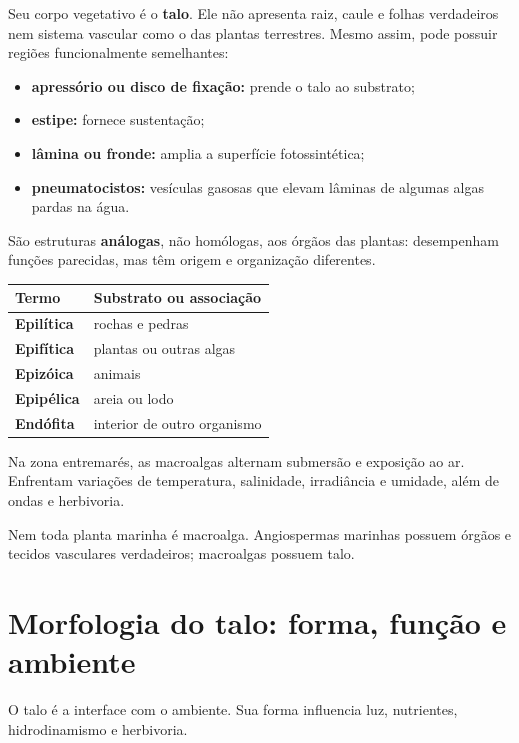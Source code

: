 \documentclass[12pt,a4paper]{article}
\begin{document}
Seu corpo vegetativo é o \textbf{talo}. Ele não apresenta raiz, caule e folhas
verdadeiros nem sistema vascular como o das plantas terrestres. Mesmo assim,
pode possuir regiões funcionalmente semelhantes:
\begin{itemize}
\item \textbf{apressório ou disco de fixação:} prende o talo ao substrato;
\item \textbf{estipe:} fornece sustentação;
\item \textbf{lâmina ou fronde:} amplia a superfície fotossintética;
\item \textbf{pneumatocistos:} vesículas gasosas que elevam lâminas de algumas
algas pardas na água.
\end{itemize}
São estruturas \textbf{análogas}, não homólogas, aos órgãos das plantas:
desempenham funções parecidas, mas têm origem e organização diferentes.

\begin{center}
\begin{tabularx}{0.86\textwidth}{>{\bfseries}lY}
\toprule
Termo & Substrato ou associação\\
\midrule
Epilítica & rochas e pedras\\
Epifítica & plantas ou outras algas\\
Epizóica & animais\\
Epipélica & areia ou lodo\\
Endófita & interior de outro organismo\\
\bottomrule
\end{tabularx}
\end{center}


Na zona entremarés, as macroalgas alternam submersão e exposição ao ar.
Enfrentam variações de temperatura, salinidade, irradiância e umidade, além de
ondas e herbivoria.
\begin{cuidado}
Nem toda planta marinha é macroalga. Angiospermas marinhas possuem órgãos e
tecidos vasculares verdadeiros; macroalgas possuem talo.
\end{cuidado}

\section{Morfologia do talo: forma, função e ambiente}
O talo é a interface com o ambiente. Sua forma influencia luz, nutrientes,
hidrodinamismo e herbivoria.
\end{document}
